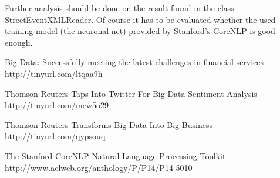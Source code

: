 \documentclass[twoside]{article}
\begin{document}
\begin{multicols}{2}
\par Further analysis should be done on the result found in the class StreetEventXMLReader. Of course it has to be evaluated whether the used training model (the neuronal net) provided by Stanford's CoreNLP is good enough. 



\begin{thebibliography}{99} %

Big Data: Successfully meeting the latest challenges in financial services
 \url{http://tinyurl.com/ltqaa9h}

Thomson Reuters Taps Into Twitter For Big Data Sentiment Analysis
 \url{http://tinyurl.com/mew5o29}

Thomson Reuters Transforms Big Data Into Big Business
 \url{http://tinyurl.com/qypsouq}

The {Stanford} {CoreNLP} Natural Language Processing Toolkit
\newblock \url{http://www.aclweb.org/anthology/P/P14/P14-5010}

\end{thebibliography}


\end{multicols}
\end{document}
